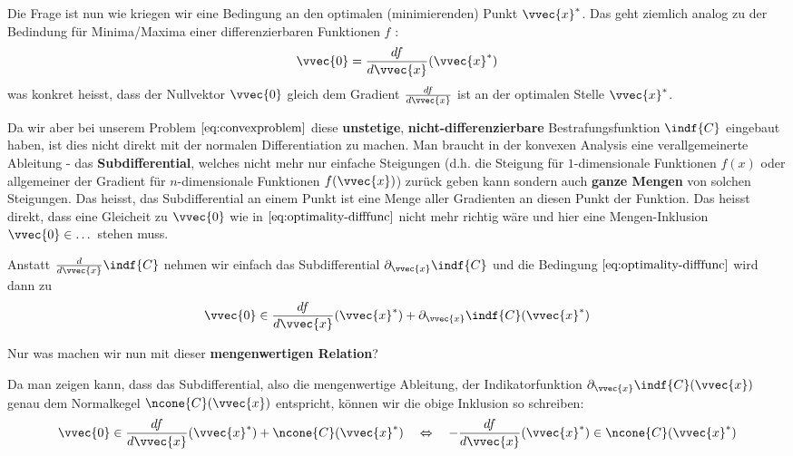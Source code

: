 \documentclass[
  12pt,
  british,
  a4paper,
  twoside,
  titlepage,
  openright,
  numbers=noenddot,
  chapterprefix=true,
  headings=optiontohead,
  svgnames,
  dvipsnames]{scrreprt}
\begin{document}
Die Frage ist nun wie kriegen wir eine Bedingung an den optimalen
(minimierenden) Punkt \(\vvec{x}^*\). Das geht ziemlich analog zu der
Bedindung für Minima/Maxima einer differenzierbaren Funktionen \(f\) :
\begin{align} \vvec{0} = \frac{df}{d\vvec{x}}(\vvec{x}^*) \label{eq:optimality-difffunc} \end{align}
was konkret heisst, dass der Nullvektor \(\vvec{0}\) gleich dem Gradient
\(\frac{df}{d\vvec{x}}\) ist an der optimalen Stelle \(\vvec{x}^*\).

Da wir aber bei unserem Problem \(\eqref{eq:convexproblem}\) diese
\textbf{unstetige}, \textbf{nicht-differenzierbare} Bestrafungsfunktion
\(\indf{C}\) eingebaut haben, ist dies nicht direkt mit der normalen
Differentiation zu machen. Man braucht in der konvexen Analysis eine
verallgemeinerte Ableitung - das \textbf{Subdifferential}, welches nicht
mehr nur einfache Steigungen (d.h. die Steigung für \(1\)-dimensionale
Funktionen \(f(x)\) oder allgemeiner der Gradient für \(n\)-dimensionale
Funktionen \(f(\vvec{x})\)) zurück geben kann sondern auch \textbf{ganze
Mengen} von solchen Steigungen. Das heisst, das Subdifferential an einem
Punkt ist eine Menge aller Gradienten an diesen Punkt der Funktion. Das
heisst direkt, dass eine Gleicheit zu \(\vvec{0}\) wie in
\(\eqref{eq:optimality-difffunc}\) nicht mehr richtig wäre und hier eine
Mengen-Inklusion \(\vvec{0} \in \dots\) stehen muss.

Anstatt \(\frac{d}{d\vvec{x}}\indf{C}\) nehmen wir einfach das
Subdifferential \(\partial_{\vvec{x}} \indf{C}\) und die Bedingung
\(\eqref{eq:optimality-difffunc}\) wird dann zu
\begin{align} \label{eq:optimality-strict-convex} \vvec{0} \in \frac{df}{d\vvec{x}}(\vvec{x}^*) + \partial_{\vvec{x}} \indf{C}(\vvec{x}^*) \end{align}

Nur was machen wir nun mit dieser \textbf{mengenwertigen Relation}?

Da man zeigen kann, dass das Subdifferential, also die mengenwertige
Ableitung, der Indikatorfunktion
\(\partial_{\vvec{x}} \indf{C}(\vvec{x})\) genau dem Normalkegel
\(\ncone{C}(\vvec{x})\) entspricht, können wir die obige Inklusion so
schreiben:
\begin{align} \vvec{0} \in \frac{df}{d\vvec{x}}(\vvec{x}^*) + \ncone{C}(\vvec{x}^*) \quad \Leftrightarrow \quad -\frac{df}{d\vvec{x}}(\vvec{x}^*) \in \ncone{C}(\vvec{x}^*) \label{eq:optimality-strict-convex-2} \end{align}
\end{document}
